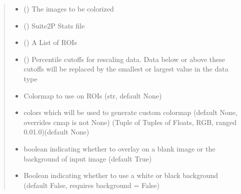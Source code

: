 \documentclass[letterpaper,10pt,english]{sphinxmanual}
\begin{document}
\begin{fulllineitems}
\begin{quote}
\begin{description}
\end{description}
\end{quote}
\begin{quote}\begin{description}
\begin{itemize}
\item {} 
\sphinxAtStartPar
{} () \textendash{} The images to be colorized

\item {} 
\sphinxAtStartPar
{} () \textendash{} Suite2P Stats file

\item {} 
\sphinxAtStartPar
{} (\sphinxstyleliteralemphasis{\sphinxupquote{{[}}}\sphinxstyleliteralemphasis{\sphinxupquote{{]}}}) \textendash{} A List of ROIs

\item {} 
\sphinxAtStartPar
{} (\sphinxstyleliteralemphasis{\sphinxupquote{{[}}}\sphinxstyleliteralemphasis{\sphinxupquote{{]}}}) \textendash{} Percentile cutoffs for rescaling data. Data below or above these cutoffs will be replaced by the smallest or largest value in the data type

\item {} 
\sphinxAtStartPar
{} \textendash{} Colormap to use on ROIs (str, default None)

\item {} 
\sphinxAtStartPar
{} \textendash{} colors which will be used to generate custom colormap (default None, overrides cmap is not None) (Tuple of Tuples of Floats, RGB, ranged 0.0\sphinxhyphen{}1.0)(default None)

\item {} 
\sphinxAtStartPar
{} \textendash{} boolean indicating whether to overlay on a blank image or the background of input image (default True)

\item {} 
\sphinxAtStartPar
{} \textendash{} Boolean indicating whether to use a white or black background (default False, requires background = False)


\end{itemize}
\end{description}
\end{quote}
\end{fulllineitems}
\end{document}
